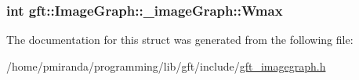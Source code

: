 \subsubsection[{\texorpdfstring{Wmax}{Wmax}}]{\setlength{\rightskip}{0pt plus 5cm}int gft\+::\+Image\+Graph\+::\+\_\+image\+Graph\+::\+Wmax}\hypertarget{structgft_1_1ImageGraph_1_1__imageGraph_a8773568670a4fc2c373775370bae17e7}{}\label{structgft_1_1ImageGraph_1_1__imageGraph_a8773568670a4fc2c373775370bae17e7}


The documentation for this struct was generated from the following file\+:\begin{DoxyCompactItemize}
\item 
/home/pmiranda/programming/lib/gft/include/\hyperlink{gft__imagegraph_8h}{gft\+\_\+imagegraph.\+h}\end{DoxyCompactItemize}
